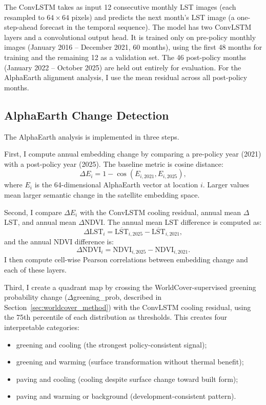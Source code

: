\documentclass{article}
\begin{document}
The ConvLSTM takes as input 12 consecutive monthly LST images
(each resampled to $64 \times 64$ pixels) and predicts the next month's LST
image (a one-step-ahead forecast in the temporal sequence). The model has two
ConvLSTM layers and a convolutional output head. It is trained only on
pre-policy monthly images (January 2016 -- December 2021, 60 months), using the
first 48 months for training and the remaining 12 as a validation set. The
46 post-policy months (January 2022 -- October 2025) are held out entirely for
evaluation. For the AlphaEarth alignment analysis, I use the mean residual
across all post-policy months.

\subsection{AlphaEarth Change Detection}

The AlphaEarth analysis is implemented in three steps.

First, I compute annual embedding change by comparing a pre-policy year (2021)
with a post-policy year (2025). The baseline metric is cosine distance:
\begin{equation}
\Delta E_i = 1 - \cos(E_{i,2021}, E_{i,2025}),
\label{eq:cosine}
\end{equation}
where $E_i$ is the 64-dimensional AlphaEarth vector at location $i$. Larger
values mean larger semantic change in the satellite embedding space.

Second, I compare $\Delta E_i$ with the ConvLSTM cooling residual, annual mean
$\Delta$LST, and annual mean $\Delta$NDVI. The annual mean LST difference is
computed as:
\begin{equation}
\Delta \mathrm{LST}_i = \overline{\mathrm{LST}}_{i,2025} - \overline{\mathrm{LST}}_{i,2021},
\label{eq:dlst}
\end{equation}
and the annual NDVI difference is:
\begin{equation}
\Delta \mathrm{NDVI}_i = \mathrm{NDVI}_{i,2025} - \mathrm{NDVI}_{i,2021}.
\label{eq:dndvi}
\end{equation}
I then compute cell-wise Pearson correlations between embedding change and each
of these layers.

Third, I create a quadrant map by crossing the WorldCover-supervised greening
probability change ($\Delta$greening\_prob, described in
Section~\ref{sec:worldcover_method}) with the ConvLSTM cooling residual, using
the 75th percentile of each distribution as thresholds. This creates four
interpretable categories:
\begin{itemize}
  \item greening and cooling (the strongest policy-consistent signal);
  \item greening and warming (surface transformation without thermal benefit);
  \item paving and cooling (cooling despite surface change toward built form);
  \item paving and warming or background (development-consistent pattern).
\end{itemize}
\end{document}
